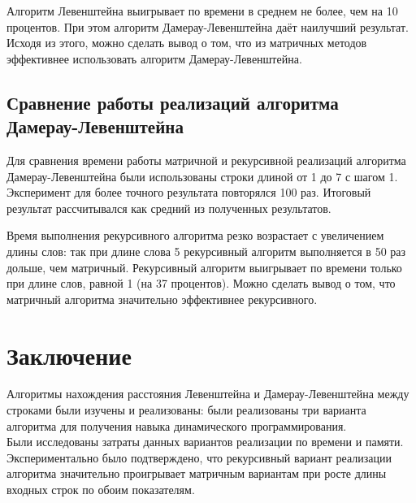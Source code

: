 \documentclass[14pt, a4paper]{report}
\begin{document}
	Алгоритм Левенштейна выигрывает по времени в среднем не более, чем на 10 процентов. При этом алгоритм Дамерау-Левенштейна даёт наилучший результат. Исходя из этого, можно сделать вывод о том, что из матричных методов эффективнее использовать алгоритм Дамерау-Левенштейна.
   
	\section{Сравнение работы реализаций алгоритма Дамерау-Левенштейна}
	Для сравнения времени работы матричной и рекурсивной реализаций алгоритма Дамерау-Левенштейна были использованы строки длиной от 1 до 7 с шагом 1. Эксперимент для более точного результата повторялся 100 раз. Итоговый результат рассчитывался как средний из полученных результатов.\\
	\vspace{1cm}
	
 	Время выполнения рекурсивного алгоритма резко возрастает с увеличением длины слов: так при длине слова 5 рекурсивный алгоритм выполняется в 50 раз дольше, чем матричный. Рекурсивный алгоритм выигрывает по времени только при длине слов, равной 1 (на 37 процентов). Можно сделать вывод о том, что матричный алгоритма значительно эффективнее рекурсивного.

	\chapter*{Заключение}
	Алгоритмы нахождения расстояния Левенштейна и Дамерау-Левенштейна между строками были изучены и реализованы: были реализованы три варианта алгоритма для получения навыка динамического программирования.\\
	Были исследованы затраты данных вариантов реализации по времени и памяти. Экспериментально было подтверждено, что рекурсивный вариант реализации алгоритма значительно проигрывает матричным вариантам при росте длины входных строк по обоим показателям.
\end{document}
